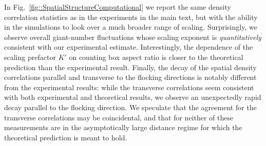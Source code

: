 \documentclass[reprint,unsortedaddress,amsmath,amssymb,aps,pre]{revtex4-2}
\begin{document}
In Fig.~\ref{fig::SpatialStructureComputational} we report the same density correlation statistics as in the experiments in the main text, but with the ability in the simulations to look over a much broader range of scaling. Surprisingly, we observe overall giant-number fluctuations whose scaling exponent is \emph{quantitatively} consistent with our experimental estimate. Interestingly, the dependence of the scaling prefactor $K'$ on counting box aspect ratio is closer to the theoretical prediction than the experimental result. Finally, the decay of the spatial density correlations parallel and transverse to the flocking directions is notably different from the experimental results: while the transverse correlations seem consistent with both experimental and theoretical results, we observe an unexpectedly rapid decay parallel to the flocking direction. We speculate that the agreement for the transverse correlations may be coincidental, and that for neither of these measurements are in the asymptotically large distance regime for which the theoretical prediction is meant to hold.




\end{document}
